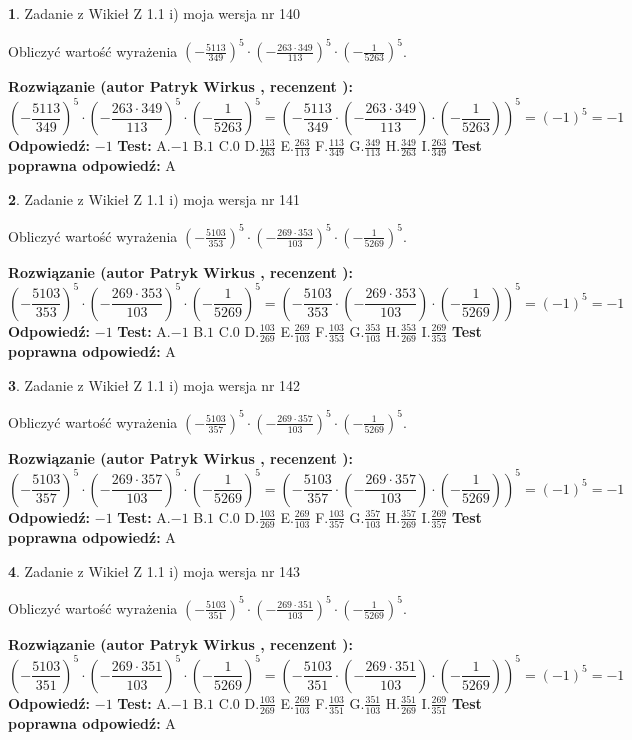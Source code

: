 \documentclass[12pt, a4paper]{article}
\theoremstyle{definition} %
\newtheorem{zad}{}
\newcommand{\zadStart}[1]{\begin{zad}#1\newline}
\newcommand{\zadStop}{\end{zad}}
\newcommand{\rozwStart}[2]{\noindent \textbf{Rozwiązanie (autor #1 , recenzent #2): }\newline}
\newcommand{\rozwStop}{\newline}
\newcommand{\odpStart}{\noindent \textbf{Odpowiedź:}\newline}
\newcommand{\odpStop}{\newline}
\newcommand{\testStart}{\noindent \textbf{Test:}\newline}
\newcommand{\testStop}{\newline}
\newcommand{\kluczStart}{\noindent \textbf{Test poprawna odpowiedź:}\newline}
\newcommand{\kluczStop}{\newline}
\begin{document}
\zadStart{Zadanie z Wikieł Z 1.1 i) moja wersja nr 140}

Obliczyć wartość wyrażenia $(-\frac{5113}{349})^{5} \cdot (-\frac{263 \cdot 349}{113})^{5} \cdot (-\frac{1}{5263})^{5}$.
\zadStop
\rozwStart{Patryk Wirkus}{}
$$(-\frac{5113}{349})^{5} \cdot (-\frac{263 \cdot 349}{113})^{5} \cdot (-\frac{1}{5263})^{5} = (-\frac{5113}{349} \cdot (-\frac{263 \cdot 349}{113}) \cdot (-\frac{1}{5263}))^{5} = (-1)^{5} = -1$$
\rozwStop
\odpStart
$-1$
\odpStop
\testStart
A.$-1$ B.$1$ C.$0$ D.$\frac{113}{263}$ E.$\frac{263}{113}$
F.$\frac{113}{349}$ G.$\frac{349}{113}$
H.$\frac{349}{263}$
I.$\frac{263}{349}$
\testStop
\kluczStart
A
\kluczStop



\zadStart{Zadanie z Wikieł Z 1.1 i) moja wersja nr 141}

Obliczyć wartość wyrażenia $(-\frac{5103}{353})^{5} \cdot (-\frac{269 \cdot 353}{103})^{5} \cdot (-\frac{1}{5269})^{5}$.
\zadStop
\rozwStart{Patryk Wirkus}{}
$$(-\frac{5103}{353})^{5} \cdot (-\frac{269 \cdot 353}{103})^{5} \cdot (-\frac{1}{5269})^{5} = (-\frac{5103}{353} \cdot (-\frac{269 \cdot 353}{103}) \cdot (-\frac{1}{5269}))^{5} = (-1)^{5} = -1$$
\rozwStop
\odpStart
$-1$
\odpStop
\testStart
A.$-1$ B.$1$ C.$0$ D.$\frac{103}{269}$ E.$\frac{269}{103}$
F.$\frac{103}{353}$ G.$\frac{353}{103}$
H.$\frac{353}{269}$
I.$\frac{269}{353}$
\testStop
\kluczStart
A
\kluczStop



\zadStart{Zadanie z Wikieł Z 1.1 i) moja wersja nr 142}

Obliczyć wartość wyrażenia $(-\frac{5103}{357})^{5} \cdot (-\frac{269 \cdot 357}{103})^{5} \cdot (-\frac{1}{5269})^{5}$.
\zadStop
\rozwStart{Patryk Wirkus}{}
$$(-\frac{5103}{357})^{5} \cdot (-\frac{269 \cdot 357}{103})^{5} \cdot (-\frac{1}{5269})^{5} = (-\frac{5103}{357} \cdot (-\frac{269 \cdot 357}{103}) \cdot (-\frac{1}{5269}))^{5} = (-1)^{5} = -1$$
\rozwStop
\odpStart
$-1$
\odpStop
\testStart
A.$-1$ B.$1$ C.$0$ D.$\frac{103}{269}$ E.$\frac{269}{103}$
F.$\frac{103}{357}$ G.$\frac{357}{103}$
H.$\frac{357}{269}$
I.$\frac{269}{357}$
\testStop
\kluczStart
A
\kluczStop



\zadStart{Zadanie z Wikieł Z 1.1 i) moja wersja nr 143}

Obliczyć wartość wyrażenia $(-\frac{5103}{351})^{5} \cdot (-\frac{269 \cdot 351}{103})^{5} \cdot (-\frac{1}{5269})^{5}$.
\zadStop
\rozwStart{Patryk Wirkus}{}
$$(-\frac{5103}{351})^{5} \cdot (-\frac{269 \cdot 351}{103})^{5} \cdot (-\frac{1}{5269})^{5} = (-\frac{5103}{351} \cdot (-\frac{269 \cdot 351}{103}) \cdot (-\frac{1}{5269}))^{5} = (-1)^{5} = -1$$
\rozwStop
\odpStart
$-1$
\odpStop
\testStart
A.$-1$ B.$1$ C.$0$ D.$\frac{103}{269}$ E.$\frac{269}{103}$
F.$\frac{103}{351}$ G.$\frac{351}{103}$
H.$\frac{351}{269}$
I.$\frac{269}{351}$
\testStop
\kluczStart
A
\kluczStop
\end{document}
